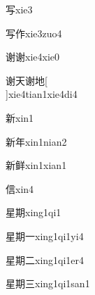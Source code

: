 \begin{verbete}[5]{写}{xie3}
\end{verbete}

\begin{verbete}[5;7]{写作}{xie3zuo4}
\end{verbete}

\begin{verbete}[12;12]{谢谢}{xie4xie0}
\end{verbete}

\begin{verbete}[12;4;12;6]{谢天谢地}[\\]{xie4tian1xie4di4}
\end{verbete}

\begin{verbete}[13]{新}{xin1}
\end{verbete}

\begin{verbete}[13;6]{新年}{xin1nian2}
\end{verbete}

\begin{verbete}[13;14]{新鲜}{xin1xian1}
\end{verbete}

\begin{verbete}[9]{信}{xin4}
\end{verbete}

\begin{verbete}[9;12]{星期}{xing1qi1}
\end{verbete}

\begin{verbete}[9;12;1]{星期一}{xing1qi1yi4}
\end{verbete}

\begin{verbete}[9;12;2]{星期二}{xing1qi1er4}
\end{verbete}

\begin{verbete}[9;12;3]{星期三}{xing1qi1san1}
\end{verbete}

